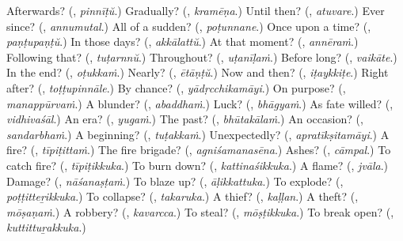 \begin{tcolorbox}[breakable,colback=teal!4,colframe=teal!35!black,title={Before you move on}]
Afterwards? (\textbf{}, \emph{pinnīṭŭ}.) Gradually? (\textbf{}, \emph{kramēṇa}.) Until then? (\textbf{}, \emph{atuvare}.) Ever since? (\textbf{}, \emph{annumutal}.) All of a sudden? (\textbf{}, \emph{poṭunnane}.) Once upon a time? (\textbf{}, \emph{paṇṭupaṇṭŭ}.) In those days? (\textbf{}, \emph{akkālattŭ}.) At that moment? (\textbf{}, \emph{annēraṁ}.) Following that? (\textbf{}, \emph{tuṭarnnŭ}.) Throughout? (\textbf{}, \emph{uṭanīḷaṁ}.) Before long? (\textbf{}, \emph{vaikāte}.) In the end? (\textbf{}, \emph{oṭukkaṁ}.) Nearly? (\textbf{}, \emph{ētāṇṭŭ}.) Now and then? (\textbf{}, \emph{iṭaykkiṭe}.) Right after? (\textbf{}, \emph{toṭṭupinnāle}.) By chance? (\textbf{}, \emph{yādṛcchikamāyi}.) On purpose? (\textbf{}, \emph{manappūrvaṁ}.) A blunder? (\textbf{}, \emph{abaddhaṁ}.) Luck? (\textbf{}, \emph{bhāgyaṁ}.) As fate willed? (\textbf{}, \emph{vidhivaśāl}.) An era? (\textbf{}, \emph{yugaṁ}.) The past? (\textbf{}, \emph{bhūtakālaṁ}.) An occasion? (\textbf{}, \emph{sandarbhaṁ}.) A beginning? (\textbf{}, \emph{tuṭakkaṁ}.) Unexpectedly? (\textbf{}, \emph{apratīkṣitamāyi}.) A fire? (\textbf{}, \emph{tīpiṭittaṁ}.) The fire brigade? (\textbf{}, \emph{agniśamanasēna}.) Ashes? (\textbf{}, \emph{cāmpal}.) To catch fire? (\textbf{}, \emph{tīpiṭikkuka}.) To burn down? (\textbf{}, \emph{kattinaśikkuka}.) A flame? (\textbf{}, \emph{jvāla}.) Damage? (\textbf{}, \emph{nāśanaṣṭaṁ}.) To blaze up? (\textbf{}, \emph{āḷikkattuka}.) To explode? (\textbf{}, \emph{poṭṭitteṟikkuka}.) To collapse? (\textbf{}, \emph{takaruka}.) A thief? (\textbf{}, \emph{kaḷḷan}.) A theft? (\textbf{}, \emph{mōṣaṇaṁ}.) A robbery? (\textbf{}, \emph{kavarcca}.) To steal? (\textbf{}, \emph{mōṣṭikkuka}.) To break open? (\textbf{}, \emph{kuttittuṟakkuka}.)
\end{tcolorbox}
